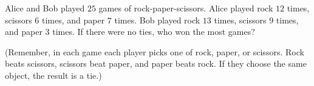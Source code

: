 Alice and Bob played $25$ games of rock-paper-scissors. Alice played rock $12$ times, scissors $6$ times, and paper $7$ times. Bob played rock $13$ times, scissors $9$ times, and paper $3$ times. If there were no ties, who won the most games?

(Remember, in each game each player picks one of rock, paper, or scissors. Rock beats scissors, scissors beat paper, and paper beats rock. If they choose the same object, the result is a tie.)
